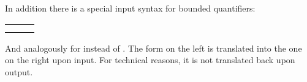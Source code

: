 \begin{isabellebody}
\begin{isamarkuptext}
In addition there is a special input syntax for bounded quantifiers:
\begin{center}
\begin{tabular}{lcl}
\isa{{\isasymforall}x\ {\isasymle}\ y{\isachardot}\ P\ x} & \isa{{\isasymrightharpoonup}} & \isa{{\isasymforall}x{\isachardot}\ x\ {\isasymle}\ y\ {\isasymlongrightarrow}\ P\ x} \\
\isa{{\isasymexists}x\ {\isasymle}\ y{\isachardot}\ P\ x} & \isa{{\isasymrightharpoonup}} & \isa{{\isasymexists}x{\isachardot}\ x\ {\isasymle}\ y\ {\isasymand}\ P\ x}
\end{tabular}
\end{center}
And analogously for \isa{{\isacharless}} instead of \isa{{\isasymle}}.
The form on the left is translated into the one on the right upon input.
For technical reasons, it is not translated back upon output.%
\end{isamarkuptext}%
\isamarkuptrue%
\isanewline
\isamarkupfalse%
\end{isabellebody}%
